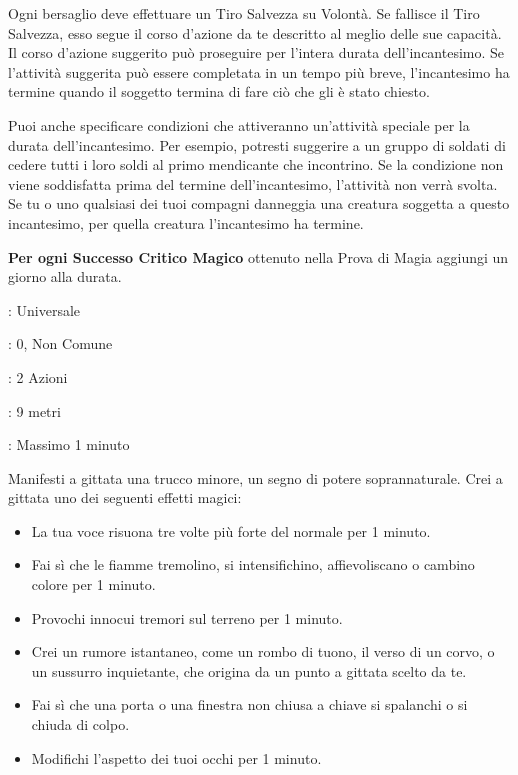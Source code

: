 \begin{multicols}{2}
Ogni bersaglio deve effettuare un Tiro Salvezza su Volontà. Se fallisce il Tiro Salvezza, esso segue il corso d'azione da te descritto al meglio delle sue capacità. Il corso d'azione suggerito può proseguire per l'intera durata dell'incantesimo. Se l'attività suggerita può essere completata in un tempo più breve, l'incantesimo ha termine quando il soggetto termina di fare ciò che gli è stato chiesto.

Puoi anche specificare condizioni che attiveranno un'attività speciale per la durata dell'incantesimo. Per esempio, potresti suggerire a un gruppo di soldati di cedere tutti i loro soldi al primo mendicante che incontrino. Se la condizione non viene soddisfatta prima del termine dell'incantesimo, l'attività non verrà svolta. Se tu o uno qualsiasi dei tuoi compagni danneggia una creatura soggetta a questo incantesimo, per quella creatura l'incantesimo ha termine.

\textbf{Per ogni Successo Critico Magico} ottenuto nella Prova di Magia aggiungi un giorno alla durata.

\noindent\colorbox{OBSSgold!10}{
\begin{minipage}{0.95\linewidth}
\begin{description}[noitemsep, topsep=0pt, parsep=0pt, partopsep=0pt, leftmargin=0cm, labelwidth=1.3cm]
	\item[\textbf{Lista}]: Universale
	\item[\textbf{Livello}]: 0, Non Comune
	\item[\textbf{Lancio}]: 2 Azioni
	\item[\textbf{Gittata}]: 9 metri
	\item[\textbf{Durata}]: Massimo 1 minuto
\end{description}
\end{minipage}}\smallskip

Manifesti a gittata una trucco minore, un segno di potere soprannaturale. Crei a gittata uno dei seguenti effetti magici:

\begin{itemize}[leftmargin=*] \setlength{\itemsep}{0pt}
	\item La tua voce risuona tre volte più forte del normale per 1 minuto.
	\item Fai sì che le fiamme tremolino, si intensifichino, affievoliscano o cambino colore per 1 minuto.
	\item Provochi innocui tremori sul terreno per 1 minuto.
	\item Crei un rumore istantaneo, come un rombo di tuono, il verso di un corvo, o un sussurro inquietante, che origina da un punto a gittata scelto da te.
	\item Fai sì che una porta o una finestra non chiusa a chiave si spalanchi o si chiuda di colpo.
	\item Modifichi l'aspetto dei tuoi occhi per 1 minuto.
\end{itemize}


\end{multicols}
